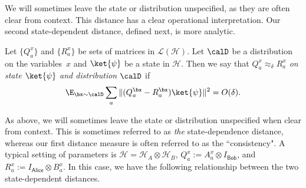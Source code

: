 \documentclass[11pt]{article}
\newcommand{\reg}[1]{{\mathsf{#1}}}
\begin{document}
We will sometimes leave the state or distribution unspecified, as they are often clear from context.
This distance has a clear operational interpretation.
Our second state-dependent distance,
defined next,
is more analytic.

\begin{definition}
Let $\{Q^x_a\}$ and $\{R^x_a\}$ be sets of matrices in $\mathcal{L}(\mathcal{H})$.
Let $\calD$ be a distribution on the variables~$x$ and $\ket{\psi}$ be a state in $\mathcal{H}$.
Then we say that \emph{$Q^x_a \approx_{\delta} R^x_a$ on state $\ket{\psi}$ and distribution $\calD$} if
\begin{equation*}
\E_{\bx \sim \calD} \sum_a \Vert (Q_{a}^{\bx} - R_{a}^{\bx} ) \ket{\psi}\Vert^2 = O(\delta).
\end{equation*}
\end{definition}

As above, we will sometimes leave the state or distribution unspecified when clear from context.
This is sometimes referred to as \emph{the} state-dependence distance,
whereas our first distance measure is often referred to as the ``consistency".
A typical setting of parameters is $\mathcal{H} = \mathcal{H}_A \otimes \mathcal{H}_B$,
$Q^x_a := A^x_a \otimes I_{\reg{Bob}}$,
and $R^x_a := I_{\reg{Alice}} \otimes B^x_a$.
In this case, we have the following relationship between the two state-dependent distances.
\end{document}
